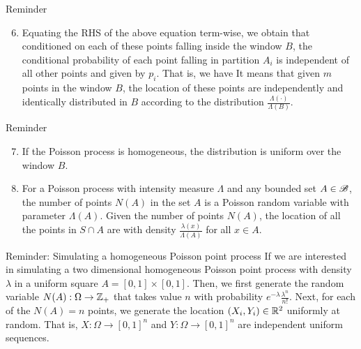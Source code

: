 \documentclass[12pt,aspectratio=169]{beamer}
\begin{document}
\begin{frame}
\begin{block}{Reminder}
\begin{enumerate}[i\_]
\setcounter{enumi}{5}
\item   
Equating the RHS of the above equation term-wise, we obtain that conditioned on each of these points falling inside the window $B$, 
the conditional probability of each point falling in partition $A_i$ is independent of all other points and given by $p_i$. 
That is, we have 
It means that given $m$ points in the window $B$, the location of these points are independently and identically distributed in $B$ according to the distribution $\frac{\Lambda(\cdot)}{\Lambda(B)}$. 
\end{enumerate}
\end{block}
\end{frame}

\begin{frame}
\begin{block}{Reminder}
\begin{enumerate}[i\_]
\setcounter{enumi}{6}
\item If the Poisson process is homogeneous, the distribution is uniform over the window $B$. 
\item For a Poisson process with intensity measure $\Lambda$ and any bounded set $A \in \mathscr{B}$, 
the number of points $N(A)$ in the set $A$ is a Poisson random variable with parameter $\Lambda(A)$. 
Given the number of points $N(A)$, the location of all the points in $S\cap A$ are \iid with density $\frac{\lambda(x)}{\Lambda(A)}$ for all $x \in A$. 
\end{enumerate}
\end{block}
\end{frame}

\begin{frame}
\begin{block}{Reminder: Simulating a homogeneous Poisson point process} 
If we are interested in simulating a two dimensional homogeneous Poisson point process with density $\lambda$ in a uniform square $A = [0,1]\times[0,1]$. 
Then, we first generate the random variable $N(A):\Omega\to\mathbb{Z}_+$ that takes value $n$ with probability $e^{-\lambda}\frac{\lambda^n}{n!}$. 
Next, for each of the $N(A)=n$ points, we generate the location $(X_i, Y_i) \in \mathbb{R}^2$ uniformly at random. 
That is, $X:\Omega\to[0,1]^n$ and $Y:\Omega\to[0,1]^n$ are independent \iid uniform sequences.
\end{block}
\end{frame}
\end{document}
